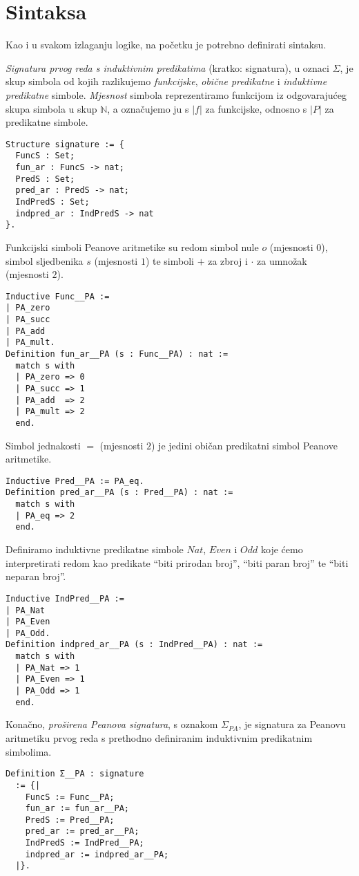 \section{Sintaksa}\label{sec:sintaksa}
Kao i u svakom izlaganju logike, na početku je potrebno definirati sintaksu.
\begin{definition}\label{def:signatura}
  \textit{Signatura prvog reda s induktivnim predikatima} (kratko: signatura), u oznaci \(\Sigma\),
  je skup simbola od kojih razlikujemo \textit{funkcijske}, \textit{obične predikatne}
  i \textit{induktivne predikatne} simbole.
  \textit{Mjesnost} simbola reprezentiramo funkcijom iz odgovarajućeg skupa simbola u skup \(\mathbb{N}\),
  a označujemo ju s \(|f|\) za funkcijske, odnosno s \(|P|\) za predikatne simbole.
  \begin{verbatim}
Structure signature := {
  FuncS : Set;
  fun_ar : FuncS -> nat;
  PredS : Set;
  pred_ar : PredS -> nat;
  IndPredS : Set;
  indpred_ar : IndPredS -> nat
}.
\end{verbatim}
\end{definition}
\begin{example}
  Funkcijski simboli Peanove aritmetike su redom simbol nule \(o\) (mjesnosti \(0\)),
  simbol sljedbenika \(s\) (mjesnosti \(1\))
  te simboli \(+\) za zbroj i \(\cdot\) za umnožak (mjesnosti \(2\)).
\begin{verbatim}
Inductive Func__PA :=
| PA_zero
| PA_succ
| PA_add
| PA_mult.
Definition fun_ar__PA (s : Func__PA) : nat :=
  match s with
  | PA_zero => 0
  | PA_succ => 1
  | PA_add  => 2
  | PA_mult => 2
  end.
\end{verbatim}
  \noindent Simbol jednakosti \(=\) (mjesnosti \(2\)) je jedini običan predikatni simbol
  Peanove aritmetike.
\begin{verbatim}
Inductive Pred__PA := PA_eq.
Definition pred_ar__PA (s : Pred__PA) : nat :=
  match s with
  | PA_eq => 2
  end.
\end{verbatim}
  \noindent Definiramo induktivne predikatne simbole
  \(\mathit{Nat}\), \(\mathit{Even}\) i \(\mathit{Odd}\) koje ćemo
  interpretirati redom kao predikate \enquote{biti prirodan broj}, \enquote{biti paran broj} te
  \enquote{biti neparan broj}.
\begin{verbatim}
Inductive IndPred__PA :=
| PA_Nat
| PA_Even
| PA_Odd.
Definition indpred_ar__PA (s : IndPred__PA) : nat :=
  match s with
  | PA_Nat => 1
  | PA_Even => 1
  | PA_Odd => 1
  end.
\end{verbatim}
  \noindent Konačno, \textit{proširena Peanova signatura}, s oznakom \(\Sigma_{\mathit{PA}}\), je signatura za
  Peanovu aritmetiku prvog reda s prethodno definiranim induktivnim predikatnim simbolima.
\begin{verbatim}
Definition Σ__PA : signature
  := {|
    FuncS := Func__PA;
    fun_ar := fun_ar__PA;
    PredS := Pred__PA;
    pred_ar := pred_ar__PA;
    IndPredS := IndPred__PA;
    indpred_ar := indpred_ar__PA;
  |}.
\end{verbatim}
\end{example}
